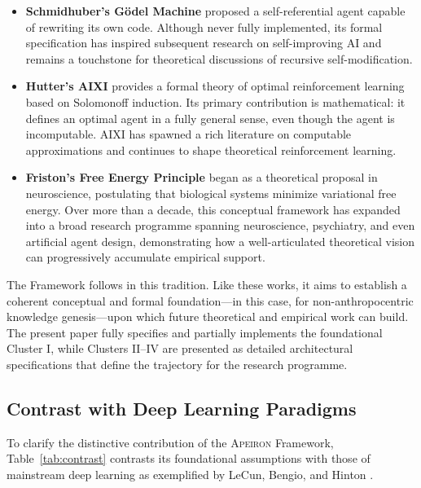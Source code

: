 \begin{itemize}
    \item \textbf{Schmidhuber's G\"odel Machine} \cite{schmidhuber2007} proposed a self-referential agent capable of rewriting its own code. Although never fully implemented, its formal specification has inspired subsequent research on self-improving AI and remains a touchstone for theoretical discussions of recursive self-modification.
    
    \item \textbf{Hutter's AIXI} \cite{hutter2005} provides a formal theory of optimal reinforcement learning based on Solomonoff induction. Its primary contribution is mathematical: it defines an optimal agent in a fully general sense, even though the agent is incomputable. AIXI has spawned a rich literature on computable approximations and continues to shape theoretical reinforcement learning.
    
    \item \textbf{Friston's Free Energy Principle} \cite{friston2010} began as a theoretical proposal in neuroscience, postulating that biological systems minimize variational free energy. Over more than a decade, this conceptual framework has expanded into a broad research programme spanning neuroscience, psychiatry, and even artificial agent design, demonstrating how a well-articulated theoretical vision can progressively accumulate empirical support.
\end{itemize}

The \Apeiron{} Framework follows in this tradition. Like these works, it aims to establish a coherent conceptual and formal foundation---in this case, for non-anthropocentric knowledge genesis---upon which future theoretical and empirical work can build. The present paper fully specifies and partially implements the foundational Cluster I, while Clusters II--IV are presented as detailed architectural specifications that define the trajectory for the research programme.

\subsection{Contrast with Deep Learning Paradigms}
\label{subsec:contrast}

To clarify the distinctive contribution of the \textsc{Apeiron} Framework, Table~\ref{tab:contrast} contrasts its foundational assumptions with those of mainstream deep learning as exemplified by LeCun, Bengio, and Hinton \cite{lecun2015}.

